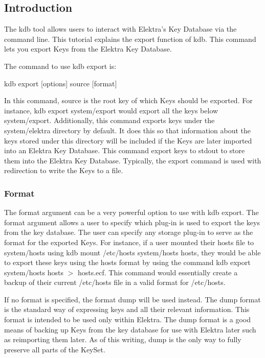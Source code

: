 \subsection*{Introduction}

The kdb tool allows users to interact with Elektra's Key Database via the command line. This tutorial explains the export function of kdb. This command lets you export Keys from the Elektra Key Database.

The command to use kdb export is\+: \begin{DoxyVerb}kdb export [options] source [format]
\end{DoxyVerb}


In this command, source is the root key of which Keys should be exported. For instance, {\ttfamily kdb export system/export} would export all the keys below system/export. Additionally, this command exports keys under the system/elektra directory by default. It does this so that information about the keys stored under this directory will be included if the Keys are later imported into an Elektra Key Database. This command export keys to stdout to store them into the Elektra Key Database. Typically, the export command is used with redirection to write the Keys to a file.

\subsubsection*{Format}

The format argument can be a very powerful option to use with kdb export. The format argument allows a user to specify which plug-\/in is used to export the keys from the key database. The user can specify any storage plug-\/in to serve as the format for the exported Keys. For instance, if a user mounted their hosts file to system/hosts using {\ttfamily kdb mount /etc/hosts system/hosts hosts}, they would be able to export these keys using the hosts format by using the command {\ttfamily kdb export system/hosts hosts $>$ hosts.\+ecf}. This command would essentially create a backup of their current /etc/hosts file in a valid format for /etc/hosts.

If no format is specified, the format {\ttfamily dump} will be used instead. The dump format is the standard way of expressing keys and all their relevant information. This format is intended to be used only within Elektra. The dump format is a good means of backing up Keys from the key database for use with Elektra later such as reimporting them later. As of this writing, dump is the only way to fully preserve all parts of the {\ttfamily Key\+Set}.

